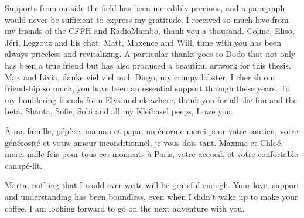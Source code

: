 \medbreak

Supports from outside the field has been incredibly precious, and a paragraph would never be sufficient to express my gratitude.
I received so much love from my friends of the CFFH and RadioMambo, thank you a thousand.
Coline, Eliso, Jéri, Legzouz and his chat, Matt, Maxence and Will, time with you has been always priceless and revitalizing.
A particular thanks goes to Dodo that not only has been a true friend but has also produced a beautiful artwork for this thesis.
Max and Livia, danke viel viel mol. 
Diego, my crimpy lobster, I cherish our friendship so much, you have been an essential support through these years.
To my bouldering friends from Elys and elsewhere, thank you for all the fun and the beta.
Shanta, Sofie, Sobi and all my Kleibasel peeps, I owe you.

\medbreak


À ma famille, pépère, maman et papa, un énorme merci pour votre soutien, votre générosité et votre amour inconditionnel, je vous dois tant.
Maxime et Chloé, merci mille fois pour tous ces moments à Paris, votre accueil, et votre confortable canapé-lit.

\medbreak

Märta, nothing that I could ever write will be grateful enough.
Your love, support and understanding has been boundless, even when I didn't wake up to make your coffee.
I am looking forward to go on the next adventure with you.

